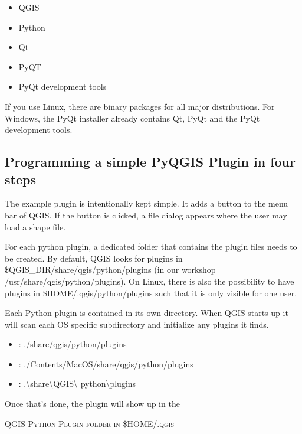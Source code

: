 \begin{itemize}
\item QGIS
\item Python
\item Qt
\item PyQT
\item PyQt development tools
\end{itemize}

If you use Linux, there are binary packages for all major distributions. For
Windows, the PyQt installer already contains Qt, PyQt and the PyQt
development tools.

\subsection{Programming a simple PyQGIS Plugin in four steps}

The example plugin is intentionally kept simple. It adds a button to the menu
bar of QGIS. If the button is clicked, a file dialog appears where the user
may load a shape file.

For each python plugin, a dedicated folder that contains the plugin files
needs to be created. By default, QGIS looks for plugins in
\$QGIS\_DIR/share/qgis/python/plugins (in our workshop
/usr/share/qgis/python/plugins). On Linux, there is also the possibility to
have plugins in \$HOME/.qgis/python/plugins such that it is only visible for
one user.


Each Python plugin is contained in its own directory. When QGIS starts up it
will scan each OS specific subdirectory and initialize any plugins it finds. 

\begin{itemize}
\item {}: ./share/qgis/python/plugins
\item {}: ./Contents/MacOS/share/qgis/python/plugins
\item {}: .\textbackslash share\textbackslash QGIS\textbackslash
python\textbackslash plugins
\end{itemize}

Once that's done, the plugin will show up in the

\begin{Tip}\caption{\textsc{QGIS Python Plugin folder in \$HOME/.qgis}}
\end{Tip}

